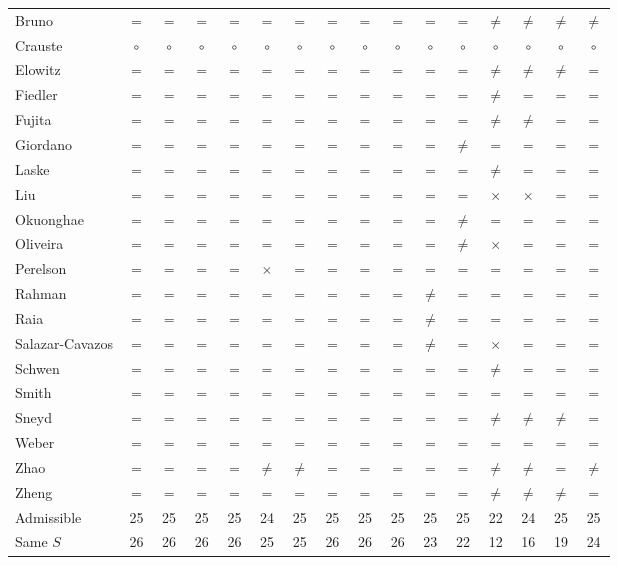 {\begin{longtable}{@{}lccccccccccccccc@{}}
Bruno & $=$ & $=$ & $=$ & $=$ & $=$ & $=$ & $=$ & $=$ & $=$ & $=$ & $=$ & $\neq$ & $\neq$ & $\neq$ & $\neq$ \\
Crauste & $\circ$ & $\circ$ & $\circ$ & $\circ$ & $\circ$ & $\circ$ & $\circ$ & $\circ$ & $\circ$ & $\circ$ & $\circ$ & $\circ$ & $\circ$ & $\circ$ & $\circ$ \\
Elowitz & $=$ & $=$ & $=$ & $=$ & $=$ & $=$ & $=$ & $=$ & $=$ & $=$ & $=$ & $\neq$ & $\neq$ & $\neq$ & $=$ \\
Fiedler & $=$ & $=$ & $=$ & $=$ & $=$ & $=$ & $=$ & $=$ & $=$ & $=$ & $=$ & $\neq$ & $=$ & $=$ & $=$ \\
Fujita & $=$ & $=$ & $=$ & $=$ & $=$ & $=$ & $=$ & $=$ & $=$ & $=$ & $=$ & $\neq$ & $\neq$ & $=$ & $=$ \\
Giordano & $=$ & $=$ & $=$ & $=$ & $=$ & $=$ & $=$ & $=$ & $=$ & $=$ & $\neq$ & $=$ & $=$ & $=$ & $=$ \\
Laske & $=$ & $=$ & $=$ & $=$ & $=$ & $=$ & $=$ & $=$ & $=$ & $=$ & $=$ & $\neq$ & $=$ & $=$ & $=$ \\
Liu & $=$ & $=$ & $=$ & $=$ & $=$ & $=$ & $=$ & $=$ & $=$ & $=$ & $=$ & $\times$ & $\times$ & $=$ & $=$ \\
Okuonghae & $=$ & $=$ & $=$ & $=$ & $=$ & $=$ & $=$ & $=$ & $=$ & $=$ & $\neq$ & $=$ & $=$ & $=$ & $=$ \\
Oliveira & $=$ & $=$ & $=$ & $=$ & $=$ & $=$ & $=$ & $=$ & $=$ & $=$ & $\neq$ & $\times$ & $=$ & $=$ & $=$ \\
Perelson & $=$ & $=$ & $=$ & $=$ & $\times$ & $=$ & $=$ & $=$ & $=$ & $=$ & $=$ & $=$ & $=$ & $=$ & $=$ \\
Rahman & $=$ & $=$ & $=$ & $=$ & $=$ & $=$ & $=$ & $=$ & $=$ & $\neq$ & $=$ & $=$ & $=$ & $=$ & $=$ \\
Raia & $=$ & $=$ & $=$ & $=$ & $=$ & $=$ & $=$ & $=$ & $=$ & $\neq$ & $=$ & $=$ & $=$ & $=$ & $=$ \\
Salazar-Cavazos & $=$ & $=$ & $=$ & $=$ & $=$ & $=$ & $=$ & $=$ & $=$ & $\neq$ & $=$ & $\times$ & $=$ & $=$ & $=$ \\
Schwen & $=$ & $=$ & $=$ & $=$ & $=$ & $=$ & $=$ & $=$ & $=$ & $=$ & $=$ & $\neq$ & $=$ & $=$ & $=$ \\
Smith & $=$ & $=$ & $=$ & $=$ & $=$ & $=$ & $=$ & $=$ & $=$ & $=$ & $=$ & $=$ & $=$ & $=$ & $=$ \\
Sneyd & $=$ & $=$ & $=$ & $=$ & $=$ & $=$ & $=$ & $=$ & $=$ & $=$ & $=$ & $\neq$ & $\neq$ & $\neq$ & $=$ \\
Weber & $=$ & $=$ & $=$ & $=$ & $=$ & $=$ & $=$ & $=$ & $=$ & $=$ & $=$ & $=$ & $=$ & $=$ & $=$ \\
Zhao & $=$ & $=$ & $=$ & $=$ & $\neq$ & $\neq$ & $=$ & $=$ & $=$ & $=$ & $=$ & $\neq$ & $\neq$ & $=$ & $\neq$ \\
Zheng & $=$ & $=$ & $=$ & $=$ & $=$ & $=$ & $=$ & $=$ & $=$ & $=$ & $=$ & $\neq$ & $\neq$ & $\neq$ & $=$ \\
\midrule
Admissible & 25 & 25 & 25 & 25 & 24 & 25 & 25 & 25 & 25 & 25 & 25 & 22 & 24 & 25 & 25 \\
Same $S$ & 26 & 26 & 26 & 26 & 25 & 25 & 26 & 26 & 26 & 23 & 22 & 12 & 16 & 19 & 24 \\
\bottomrule \end{longtable}}


